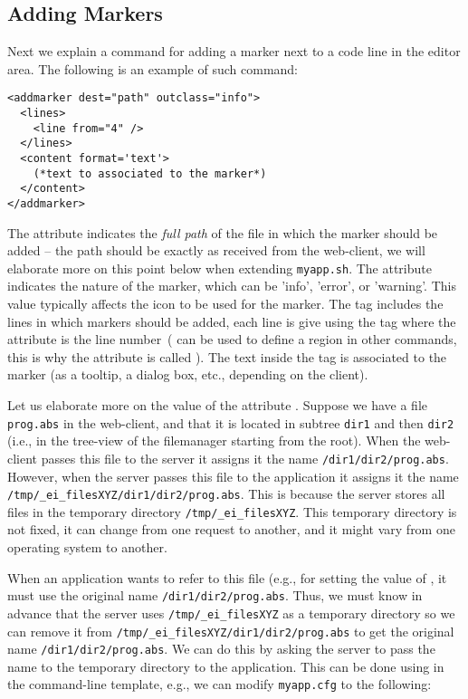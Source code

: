 \subsection{Adding Markers}

Next we explain a command for adding a marker next to a code line in
the editor area. The following is an example of such command:

\medskip
\begin{lstlisting}
<addmarker dest="path" outclass="info">
  <lines>
    <line from="4" />
  </lines>
  <content format='text'>
    (*text to associated to the marker*)
  </content>
</addmarker>
\end{lstlisting}

\medskip
\noindent
The attribute  indicates the \emph{full path} of the file in
which the marker should be added -- the path should be exactly as
received from the web-client, we will elaborate more on this point
below when extending \texttt{myapp.sh}.
%
The attribute  indicates the nature of the marker, which
can be 'info', 'error', or 'warning'. This value typically affects the
icon to be used for the marker.
%
The tag  includes the lines in which markers should be
added, each line is give using the tag  where the 
attribute is the line number~( can be used to define a
region in other commands, this is why the attribute is called
).
%
The text inside the  tag is associated to the marker (as
a tooltip, a dialog box, etc., depending on the client).

Let us elaborate more on the value of the attribute
. Suppose we have a file \texttt{prog.abs} in the
web-client, and that it is located in subtree \texttt{dir1} and then
\texttt{dir2} (i.e., in the tree-view of the filemanager starting from
the root).
%
When the web-client passes this file to the server it assigns it the
name \texttt{/dir1/dir2/prog.abs}. However, when the server passes
this file to the application it assigns it the name
\texttt{/tmp/\_ei\_filesXYZ/dir1/dir2/prog.abs}. 
%
This is because the server stores all files in the temporary directory
\texttt{/tmp/\_ei\_filesXYZ}. This temporary directory is not fixed, it
can change from one request to another, and it might vary from one
operating system to another.

When an application wants to refer to this file (e.g., for setting the
value of , it must use the original name
\texttt{/dir1/dir2/prog.abs}.
%
Thus, we must know in advance that the server uses
\texttt{/tmp/\_ei\_filesXYZ} as a temporary directory so we can remove
it from \texttt{/tmp/\_ei\_filesXYZ/dir1/dir2/prog.abs} to get the
original name \texttt{/dir1/dir2/prog.abs}. 
%
We can do this by asking the server to pass the name to the temporary
directory to the application. This can be done using  in
the command-line template, e.g., we can modify \texttt{myapp.cfg} to
the following:

